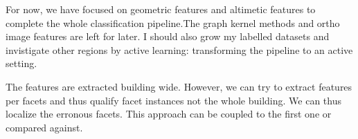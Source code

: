 \documentclass[../main.tex]{subfiles}
\begin{document}
	For now, we have focused on geometric features and altimetic features to complete the whole classification pipeline.The graph kernel methods and ortho image features are left for later. I should also grow my labelled datasets and invistigate other regions by active learning: transforming the pipeline to an active setting.

	The features are extracted building wide. However, we can try to extract features per facets and thus qualify facet instances not the whole building. We can thus localize the erronous facets. This approach can be coupled to the first one or compared against.
\end{document}
